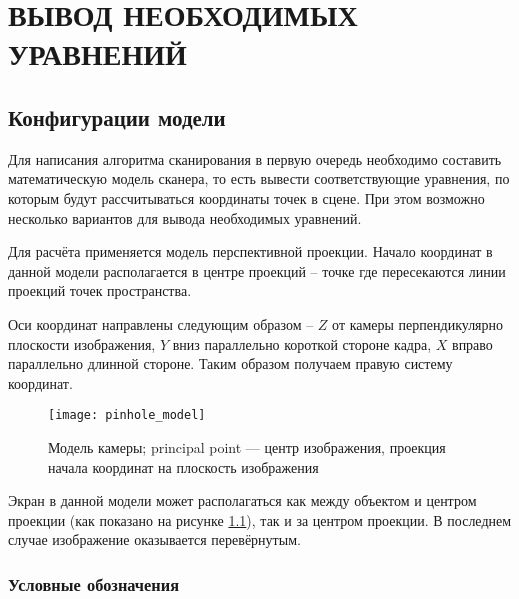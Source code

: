 \chapter{ВЫВОД НЕОБХОДИМЫХ УРАВНЕНИЙ}\label{chap:math}
    \section{Конфигурации модели}
        Для написания алгоритма сканирования в первую очередь необходимо составить математическую модель сканера, то есть вывести соответствующие уравнения, по которым будут рассчитываться координаты точек в сцене. При этом возможно несколько вариантов для вывода необходимых уравнений.
        
        Для расчёта применяется модель перспективной проекции. Начало координат в данной модели располагается в центре проекций -- точке где пересекаются линии проекций точек пространства.
        
        Оси координат направлены следующим образом -- $ Z $ от камеры перпендикулярно плоскости изображения, $ Y $ вниз параллельно короткой стороне кадра, $ X $ вправо параллельно длинной стороне. Таким образом получаем правую систему координат.
        
        \begin{figure}[H]
            \centering
            \texttt{[image: pinhole\_model]}
            \caption{Модель камеры; principal point --- центр изображения, проекция начала координат на плоскость изображения}\label{pic:pinhole_model}
        \end{figure}

        Экран в данной модели может располагаться как между объектом и центром проекции (как показано на рисунке \ref{pic:pinhole_model}), так и за центром проекции. В последнем случае изображение оказывается перевёрнутым.

        \subsection{Условные обозначения}
